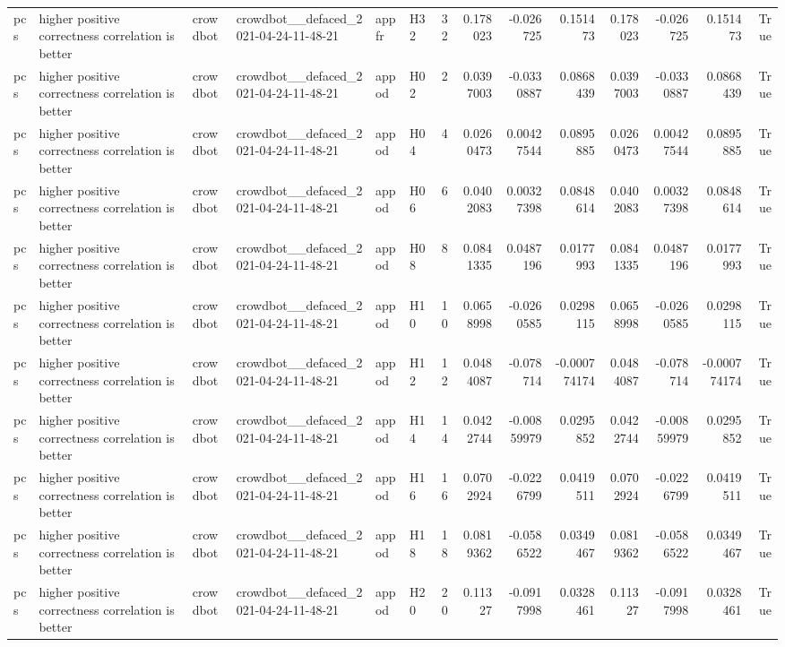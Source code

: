 \begin{longtable}{llllllrrrrrrrr}
pcs & higher positive correctness correlation is better & crowdbot & crowdbot\_\_defaced\_2021-04-24-11-48-21 & appfr & H32 & 32 & 0.178023 & -0.026725 & 0.151473 & 0.178023 & -0.026725 & 0.151473 & True \\
pcs & higher positive correctness correlation is better & crowdbot & crowdbot\_\_defaced\_2021-04-24-11-48-21 & appod & H02 & 2 & 0.0397003 & -0.0330887 & 0.0868439 & 0.0397003 & -0.0330887 & 0.0868439 & True \\
pcs & higher positive correctness correlation is better & crowdbot & crowdbot\_\_defaced\_2021-04-24-11-48-21 & appod & H04 & 4 & 0.0260473 & 0.00427544 & 0.0895885 & 0.0260473 & 0.00427544 & 0.0895885 & True \\
pcs & higher positive correctness correlation is better & crowdbot & crowdbot\_\_defaced\_2021-04-24-11-48-21 & appod & H06 & 6 & 0.0402083 & 0.00327398 & 0.0848614 & 0.0402083 & 0.00327398 & 0.0848614 & True \\
pcs & higher positive correctness correlation is better & crowdbot & crowdbot\_\_defaced\_2021-04-24-11-48-21 & appod & H08 & 8 & 0.0841335 & 0.0487196 & 0.0177993 & 0.0841335 & 0.0487196 & 0.0177993 & True \\
pcs & higher positive correctness correlation is better & crowdbot & crowdbot\_\_defaced\_2021-04-24-11-48-21 & appod & H10 & 10 & 0.0658998 & -0.0260585 & 0.0298115 & 0.0658998 & -0.0260585 & 0.0298115 & True \\
pcs & higher positive correctness correlation is better & crowdbot & crowdbot\_\_defaced\_2021-04-24-11-48-21 & appod & H12 & 12 & 0.0484087 & -0.078714 & -0.000774174 & 0.0484087 & -0.078714 & -0.000774174 & True \\
pcs & higher positive correctness correlation is better & crowdbot & crowdbot\_\_defaced\_2021-04-24-11-48-21 & appod & H14 & 14 & 0.0422744 & -0.00859979 & 0.0295852 & 0.0422744 & -0.00859979 & 0.0295852 & True \\
pcs & higher positive correctness correlation is better & crowdbot & crowdbot\_\_defaced\_2021-04-24-11-48-21 & appod & H16 & 16 & 0.0702924 & -0.0226799 & 0.0419511 & 0.0702924 & -0.0226799 & 0.0419511 & True \\
pcs & higher positive correctness correlation is better & crowdbot & crowdbot\_\_defaced\_2021-04-24-11-48-21 & appod & H18 & 18 & 0.0819362 & -0.0586522 & 0.0349467 & 0.0819362 & -0.0586522 & 0.0349467 & True \\
pcs & higher positive correctness correlation is better & crowdbot & crowdbot\_\_defaced\_2021-04-24-11-48-21 & appod & H20 & 20 & 0.11327 & -0.0917998 & 0.0328461 & 0.11327 & -0.0917998 & 0.0328461 & True \\

\end{longtable}
